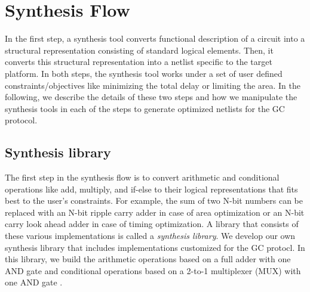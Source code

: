 \section{Synthesis Flow}
In the first step, a synthesis tool converts functional description of a circuit into a structural representation consisting of standard logical elements.
Then, it converts this structural representation into a netlist specific to the target platform.
In both steps, the synthesis tool works under a set of user defined constraints/objectives like minimizing the total delay or limiting the area.
In the following, we describe the details of these two steps and how we manipulate the synthesis tools in each of the steps to generate optimized netlists for the GC protocol.

\subsection{Synthesis library}
The first step in the synthesis flow is to convert arithmetic and conditional operations like add, multiply, and if-else to their logical representations that fits best to the user's constraints.
For example, the sum of two N-bit numbers can be replaced with an N-bit ripple carry adder in case of area optimization or an N-bit carry look ahead adder in case of timing optimization.
A library that consists of these various implementations is called a \emph{synthesis library}.
We develop our own synthesis library that includes implementations customized for the GC protocl.
In this library, we build the arithmetic operations based on a full adder with one AND gate \cite{boyar2006concrete} and conditional operations based on a 2-to-1 multiplexer (MUX) with one AND gate \cite{kolesnikov2008improved}.

